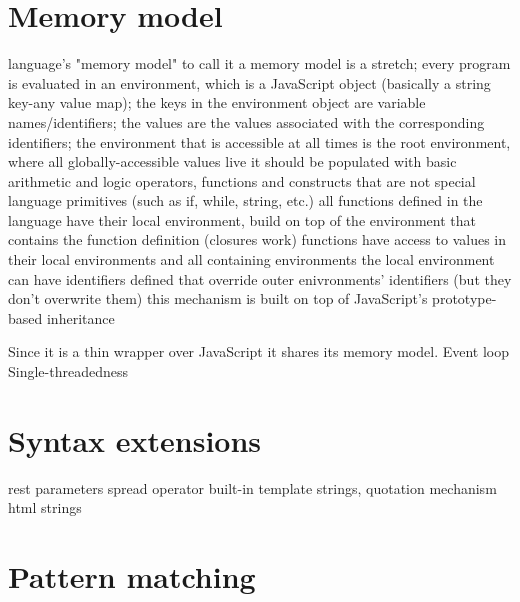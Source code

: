 \section{Memory model}

language's "memory model"
    to call it a memory model is a stretch;
    every program is evaluated in an environment, which is a JavaScript object (basically a string key-any value map);
    the keys in the environment object are variable names/identifiers;
    the values are the values associated with the corresponding identifiers;
    the environment that is accessible at all times is the root environment, where all globally-accessible values live
    it should be populated with basic arithmetic and logic operators, functions and constructs that are not special language primitives (such as if, while, string, etc.)
    all functions defined in the language have their local environment, build on top of the environment that contains the function definition (closures work)
    functions have access to values in their local environments and all containing environments
    the local environment can have identifiers defined that override outer enivronments' identifiers (but they don't overwrite them)
    this mechanism is built on top of JavaScript's prototype-based inheritance
    
Since it is a thin wrapper over JavaScript it shares its memory model.
Event loop
Single-threadedness


\section{Syntax extensions}
rest parameters
spread operator
built-in template strings, quotation mechanism
html strings 

\section{Pattern matching}